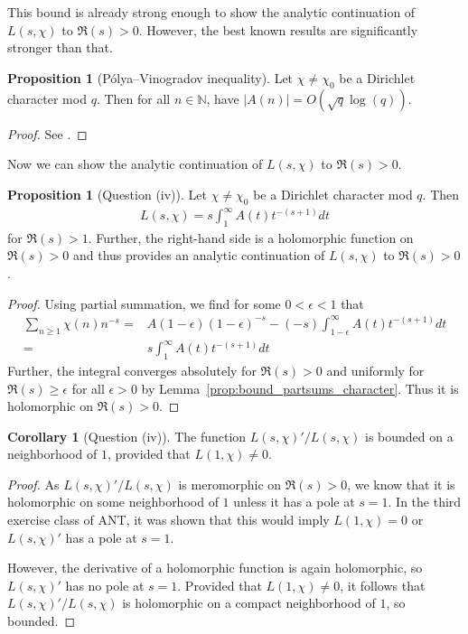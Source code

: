 \documentclass{scrartcl}
\newcommand{\N}{\mathbb{N}}
\theoremstyle{definition}
\newtheorem{proposition}[definition]{Proposition}
\newtheorem{corollary}[definition]{Corollary}
\begin{document}
This bound is already strong enough to show the analytic continuation of $L(s, \chi)$ to $\Re(s) > 0$.
However, the best known results are significantly stronger than that.
\begin{proposition}[Pólya–Vinogradov inequality]
    Let $\chi \neq \chi_0$ be a Dirichlet character mod $q$. 
    Then for all $n \in \N$, have $|A(n)| = O(\sqrt{q}\log(q))$.
\end{proposition}
\begin{proof}
    See \cite[Ch. 23]{davenport}.
\end{proof}
Now we can show the analytic continuation of $L(s, \chi)$ to $\Re(s) > 0$.
\begin{proposition}[Question (iv)]
    Let $\chi \neq \chi_0$ be a Dirichlet character mod $q$.
    Then
    \begin{align*}
        L(s, \chi) = s \int_1^\infty A(t) t^{-(s + 1)} dt
    \end{align*}
    for $\Re(s) > 1$.
    Further, the right-hand side is a holomorphic function on $\Re(s) > 0$ and thus provides an analytic continuation of $L(s, \chi)$ to $\Re(s) > 0$.
\end{proposition}
\begin{proof}
    Using partial summation, we find for some $0 < \epsilon < 1$ that
    \begin{align*}
        \sum_{n \geq 1} \chi(n) n^{-s} =& A(1 - \epsilon) (1 - \epsilon)^{-s} - (-s) \int_{1 - \epsilon}^\infty A(t) t^{-(s + 1)} dt \\
        =& s \int_1^\infty A(t) t^{-(s + 1)} dt
    \end{align*}
    Further, the integral converges absolutely for $\Re(s) > 0$ and uniformly for $\Re(s) \geq \epsilon$ for all $\epsilon > 0$ by Lemma~\ref{prop:bound_partsums_character}.
    Thus it is holomorphic on $\Re(s) > 0$.
\end{proof}
\begin{corollary}[Question (iv)]
    \label{prop:logarithmic_derivative_L_bounded}
    The function $L(s, \chi)'/L(s, \chi)$ is bounded on a neighborhood of $1$, provided that $L(1, \chi) \neq 0$.
\end{corollary}
\begin{proof}
    As $L(s, \chi)'/L(s, \chi)$ is meromorphic on $\Re(s) > 0$, we know that it is holomorphic on some neighborhood of $1$ unless it has a pole at $s = 1$.
    In the third exercise class of ANT, it was shown that this would imply $L(1, \chi) = 0$ or $L(s, \chi)'$ has a pole at $s = 1$.

    However, the derivative of a holomorphic function is again holomorphic, so $L(s, \chi)'$ has no pole at $s = 1$.
    Provided that $L(1, \chi) \neq 0$, it follows that $L(s, \chi)'/L(s, \chi)$ is holomorphic on a compact neighborhood of $1$, so bounded.
\end{proof}
\end{document}
